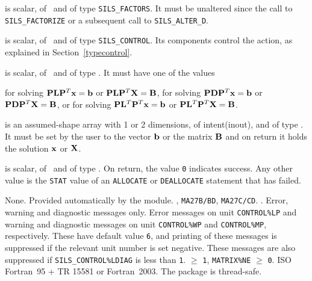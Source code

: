 \documentclass{galahad}
\newcommand{\packagename}{SILS}
\begin{document}
\begin{description} 
 is scalar, of \intentin\ and of type {\tt \packagename\_FACTORS}.
It must be unaltered since the call to {\tt \packagename\_FACTORIZE}  
or a subsequent call to {\tt \packagename\_ALTER\_D}. 
 
 is scalar, of \intentin\ and of type {\tt \packagename\_CONTROL}.
Its components control the action, as explained in Section~\ref{typecontrol}. 
 
 is scalar, of \intentin\, and of type \character. It 
must have one of the values 
\begin{description} 
 for solving ${\mathbf{P}} {\mathbf{L}} {\mathbf{P}}^T {\mathbf{x}} =  {\mathbf{b}}$ or 
                     ${\mathbf{P}} {\mathbf{L}} {\mathbf{P}}^T {\mathbf{X}} =  {\mathbf{B}}$,  
 for solving ${\mathbf{P}} {\mathbf{D}} {\mathbf{P}}^T {\mathbf{x}} =  {\mathbf{b}}$ or 
                  ${\mathbf{P}} {\mathbf{D}} {\mathbf{P}}^T {\mathbf{X}} =  {\mathbf{B}}$, or  
 for solving ${\mathbf{P}} {\mathbf{L}}^T {\mathbf{P}}^T {\mathbf{x}} =  {\mathbf{b}}$ or 
                  ${\mathbf{P}} {\mathbf{L}}^T {\mathbf{P}}^T {\mathbf{X}} = {\mathbf{B}}$.  
\end{description} 
 
 is an assumed-shape array with 1 or 2 dimensions, of 
intent(inout), and of type \realdp.  It must be set by the user to the 
vector ${\mathbf{b}}$ or the matrix ${\mathbf{B}}$ and on return it holds the solution 
${\mathbf{x}}$ or ${\mathbf{X}}$. 
 
 is scalar, of \intentout\, and of type \integer.  On return, 
the value {\tt 0} indicates success. Any other value is the {\tt STAT} value of 
an  {\tt ALLOCATE} or {\tt DEALLOCATE} statement that has failed. 
 
\end{description} 


\galgeneral

\galcommon None.
\galworkspace Provided automatically by the module.
, {\tt MA27B/BD}, {\tt MA27C/CD}.
.
\galio Error, warning and diagnostic messages only.  Error 
 messages on unit {\tt CONTROL\%LP} and warning and diagnostic messages on unit 
 {\tt CONTROL\%WP} and  {\tt CONTROL\%MP}, respectively.  These have default 
 value {\tt 6},  and printing of these messages 
 is suppressed if the relevant unit number is set negative.  These messages are
 also suppressed if {\tt \packagename\_CONTROL\%LDIAG} is less than {\tt 1}. 
 $\geq$ {\tt 1}, 
                 {\tt MATRIX\%NE} $\geq$ {\tt 0}. 
\galportability ISO Fortran~95 + TR 15581 or Fortran~2003. 
The package is thread-safe.
\end{document}
